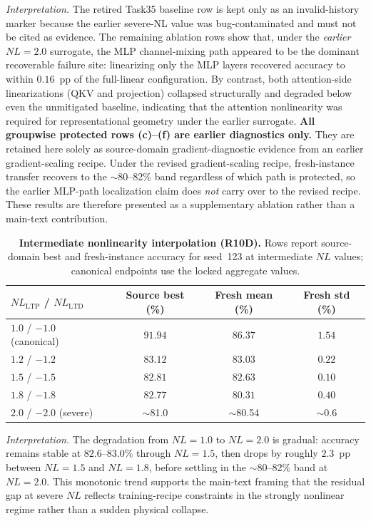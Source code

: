 \textit{Interpretation.} The retired Task35 baseline row is kept only as an invalid-history marker because the earlier severe-NL value was bug-contaminated and must not be cited as evidence. The remaining ablation rows show that, under the \emph{earlier} $NL=2.0$ surrogate, the MLP channel-mixing path appeared to be the dominant recoverable failure site: linearizing only the MLP layers recovered accuracy to within $0.16$~pp of the full-linear configuration. By contrast, both attention-side linearizations (QKV and projection) collapsed structurally and degraded below even the unmitigated baseline, indicating that the attention nonlinearity was required for representational geometry under the earlier surrogate. \textbf{All groupwise protected rows (c)--(f) are earlier diagnostics only.} They are retained here solely as source-domain gradient-diagnostic evidence from an earlier gradient-scaling recipe. Under the revised gradient-scaling recipe, fresh-instance transfer recovers to the $\sim$80--82\% band regardless of which path is protected, so the earlier MLP-path localization claim does \emph{not} carry over to the revised recipe. These results are therefore presented as a supplementary ablation rather than a main-text contribution.

\begin{table}[ht]
    \centering
    \caption{\textbf{Intermediate nonlinearity interpolation (R10D).} Rows report source-domain best and fresh-instance accuracy for seed~123 at intermediate $NL$ values; canonical endpoints use the locked aggregate values.}
    \label{tab:r10d-nl-interpolation}
    \small
    \begin{tabular}{@{}lccc@{}}
        \toprule
        $NL_{\text{LTP}}$ / $NL_{\text{LTD}}$ & Source best (\%) & Fresh mean (\%) & Fresh std (\%) \\
        \midrule
        $1.0$ / $-1.0$ (canonical) & $91.94$ & $86.37$ & $1.54$ \\
        $1.2$ / $-1.2$ & $83.12$ & $83.03$ & $0.22$ \\
        $1.5$ / $-1.5$ & $82.81$ & $82.63$ & $0.10$ \\
        $1.8$ / $-1.8$ & $82.77$ & $80.31$ & $0.40$ \\
        $2.0$ / $-2.0$ (severe) & $\sim$81.0 & $\sim$80.54 & $\sim$0.6 \\
        \bottomrule
    \end{tabular}
\end{table}

\textit{Interpretation.} The degradation from $NL=1.0$ to $NL=2.0$ is gradual: accuracy remains stable at $82.6$--$83.0$\% through $NL=1.5$, then drops by roughly $2.3$~pp between $NL=1.5$ and $NL=1.8$, before settling in the $\sim$80--82\% band at $NL=2.0$. This monotonic trend supports the main-text framing that the residual gap at severe $NL$ reflects training-recipe constraints in the strongly nonlinear regime rather than a sudden physical collapse.

